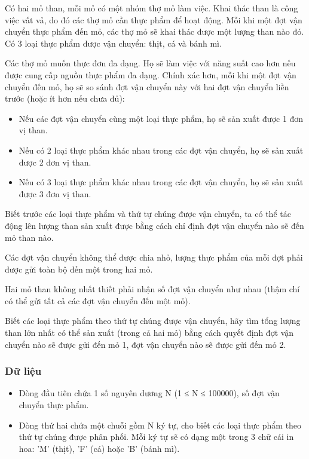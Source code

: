 



   Có hai mỏ than, mỗi mỏ có một nhóm thợ mỏ làm việc. Khai thác than là công việc vất vả, do đó các thợ mỏ cần thực phẩm để hoạt động. Mỗi khi một đợt vận chuyển thực phẩm đến mỏ, các thợ mỏ sẽ khai thác được một lượng than nào đó. Có 3 loại thực phẩm được vận chuyển: thịt, cá và bánh mì.  

   Các thợ mỏ muốn thực đơn đa dạng. Họ sẽ làm việc với năng suất cao hơn nếu được cung cấp nguồn thực phẩm đa dạng. Chính xác hơn, mỗi khi một đợt vận chuyển đến mỏ, họ sẽ so sánh đợt vận chuyển này với hai đợt vận chuyển liền trước (hoặc ít hơn nếu chưa đủ):  
\begin{itemize}
	\item     Nếu các đợt vận chuyển cùng một loại thực phẩm, họ sẽ sản xuất được 1 đơn vị than.   
	\item     Nếu có 2 loại thực phẩm khác nhau trong các đợt vận chuyển, họ sẽ sản xuất được 2 đơn vị than.   
	\item     Nếu có 3 loại thực phẩm khác nhau trong các đợt vận chuyển, họ sẽ sản xuất được 3 đơn vị than.   
\end{itemize}

   Biết trước các loại thực phẩm và thứ tự chúng được vận chuyển, ta có thể tác động lên lượng than sản xuất được bằng cách chỉ định đợt vận chuyển nào sẽ đến mỏ than nào.  

   Các đợt vận chuyển không thể được chia nhỏ, lượng thực phẩm của mỗi đợt phải được gửi toàn bộ đến một trong hai mỏ.  

   Hai mỏ than không nhất thiết phải nhận số đợt vận chuyển như nhau (thậm chí có thể gửi tất cả các đợt vận chuyển đến một mỏ).  

   Biết các loại thực phẩm theo thứ tự chúng được vận chuyển, hãy tìm tổng lượng than lớn nhất có thể sản xuất (trong cả hai mỏ) bằng cách quyết định đợt vận chuyển nào sẽ được gửi đến mỏ 1, đợt vận chuyển nào sẽ được gửi đến mỏ 2.  

\subsubsection{   Dữ liệu  }
\begin{itemize}
	\item     Dòng đầu tiên chứa 1 số nguyên dương N (1 ≤ N ≤ 100000), số đợt vận chuyển thực phẩm.   
	\item     Dòng thứ hai chứa một chuỗi gồm N ký tự, cho biết các loại thực phẩm theo thứ tự chúng được phân phối. Mỗi ký tự sẽ có dạng một trong 3 chữ cái in hoa: 'M' (thịt), 'F' (cá) hoặc 'B' (bánh mì).   
\end{itemize}

